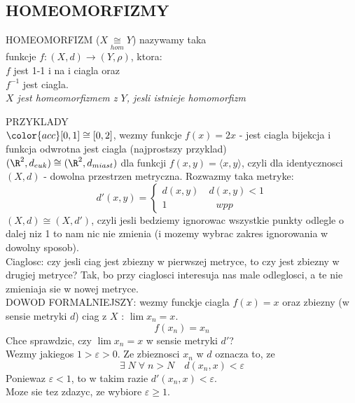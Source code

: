 \documentclass{article}
\begin{document}
\subsection*{HOMEOMORFIZMY}
    \begin{center}\large
        \color{def}HOMEOMORFIZM \color{txt}($X\underset{hom}{\cong}Y$) nazywamy taka \\funkcje $f:(X,d)\to(Y,\rho)$, ktora:\medskip\\
        $f$ jest 1-1 i na i ciagla oraz \smallskip\\
        $f^{-1}$ jest ciagla.\medskip\\
        \emph{$X$ jest homeomorfizmem z $Y$, jesli istnieje homomorfizm}
    \end{center}\bigskip
    \large \color{emp}PRZYKLADY\color{txt}\normalsize\bigskip\\
    $\color{acc}[0,1]\cong [0,2]$, wezmy funkcje $f(x)=2x$ - jest ciagla bijekcja i funkcja odwrotna jest ciagla (najprostszy przyklad)\medskip\\
    $(\R^2, d_{euk})\cong(\R^2, d_{miast})$ dla funkcji $f(x,y)=\langle x,y\rangle$, czyli dla identycznosci\smallskip\\
    $(X, d)$ - dowolna przestrzen metryczna. Rozwazmy taka metryke:
        $$d'(x,y)=\begin{cases}d(x,y)\quad d(x,y)<1\\1\quad \quad\quad\quad\quad wpp\end{cases}$$
    $(X, d)\cong(X, d')$, czyli jesli bedziemy ignorowac wszystkie punkty odlegle o dalej niz 1 to nam nic nie zmienia (i mozemy wybrac zakres ignorowania w dowolny sposob).\smallskip\\
    Ciaglosc: czy jesli ciag jest zbiezny w pierwszej metryce, to czy jest zbiezny w drugiej metryce? Tak, bo przy ciaglosci interesuja nas male odleglosci, a te nie zmieniaja sie w nowej metryce.\smallskip\\
    \color{acc}DOWOD FORMALNIEJSZY\color{txt}: wezmy funckje ciagla $f(x)=x$ oraz zbiezny (w sensie metryki $d$) ciag z $X$ : $\lim x_n=x$. 
        $$f(x_n)=x_n$$
    Chce sprawdzic, czy $\lim x_n=x$ w sensie metryki $d'$?\smallskip\\
    Wezmy jakiegos $1>\varepsilon>0$. Ze zbieznosci $x_n$ w $d$ oznacza to, ze
        $$\exists\;N\;\forall\;n>N\quad d(x_n,x)<\varepsilon$$
    Poniewaz $\varepsilon<1$, to w takim razie $d'(x_n, x)<\varepsilon$.\smallskip\\
    Moze sie tez zdazyc, ze wybiore $\varepsilon\geq1$.
\end{document}
